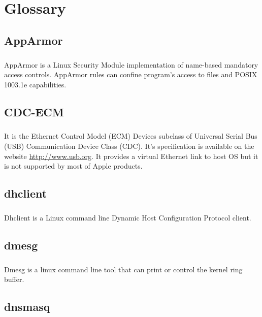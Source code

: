 \documentclass[mscthesis]{usiinfthesis}
\begin{document}
\backmatter

\chapter{Glossary} %
\section{AppArmor}\label{sec:AppArmor}
\paragraph{}
AppArmor is a Linux Security Module implementation of name-based mandatory access controls. AppArmor rules can confine program's access to files and POSIX 1003.1e capabilities.

\section{CDC-ECM}\label{sec:CDC-ECM}
\paragraph{}
It is the Ethernet Control Model (ECM) Devices subclass of Universal Serial Bus (USB) Communication Device Class (CDC). It's specification is available on the website \url{http://www.usb.org}. It provides a virtual Ethernet link to host OS but it is not supported by most of Apple products.

\section{dhclient}\label{sec:dhclient}
\paragraph{}
Dhclient is a Linux command line Dynamic Host Configuration Protocol client.

\section{dmesg}\label{sec:dmesg}
\paragraph{}
Dmesg is a linux command line tool that can print or control the kernel ring buffer.

\section{dnsmasq}\label{sec:dnsmasq}
\end{document}
